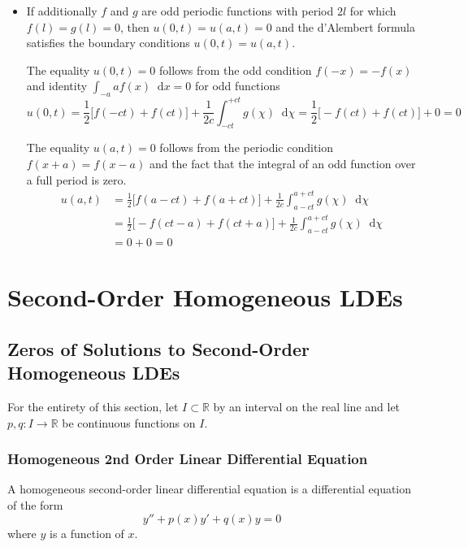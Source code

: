 \documentclass[11pt, a4paper]{article}
\newcommand{\diff}{\mathop{}\!\mathrm{d}} %
\newcommand{\R}{\mathbb{R}} %
\begin{document}
\begin{itemize}
	\item If additionally $ f $ and $ g $ are odd periodic functions with period $ 2l $ for which $ f(l) = g(l) = 0 $, then $ u(0, t) = u(a, t) = 0 $ and the d'Alembert formula satisfies the boundary conditions $ u(0, t) = u(a, t) $. 
	
	The equality $ u(0, t) = 0 $ follows from the odd condition $ f(-x) = -f(x) $ and identity $ \int_{-a}{a}f(x)\diff x = 0 $ for odd functions
	\begin{equation*}
		u(0, t) = \frac{1}{2}\big[ f(-ct) + f(ct)\big] + \frac{1}{2c} \int_{-ct}^{+ct}g(\chi)\diff \chi = \frac{1}{2}\big[-f(ct) + f(ct) \big] + 0 = 0
	\end{equation*}
	
	The equality $ u(a, t) = 0  $ follows from the periodic condition $ f(x + a) = f(x - a) $ and the fact that the integral of an odd function over a full period is zero.
	\begin{align*}
		u(a, t) &= \frac{1}{2}\big[ f(a-ct) + f(a + ct)\big] + \frac{1}{2c} \int_{a-ct}^{a+ct}g(\chi)\diff \chi\\
		&=\frac{1}{2}\big[ -f(ct-a) + f(ct+a)\big] + \frac{1}{2c} \int_{a-ct}^{a+ct}g(\chi)\diff \chi\\
		&= 0 + 0 = 0
	\end{align*}
	
	
\end{itemize}

\newpage 

\section{Second-Order Homogeneous LDEs}

\subsection{Zeros of Solutions to Second-Order Homogeneous LDEs}

For the entirety of this section, let $ I \subset \R $ by an interval on the real line and let $ p, q : I \to \R $ be continuous functions on $ I $.

\subsubsection{Homogeneous 2nd Order Linear 
Differential Equation}
A homogeneous second-order linear differential equation is a differential equation of the form
\begin{equation*}
	y'' + p(x) y' + q(x) y = 0
\end{equation*}
where $ y $ is a function of $ x $.
\end{document}
